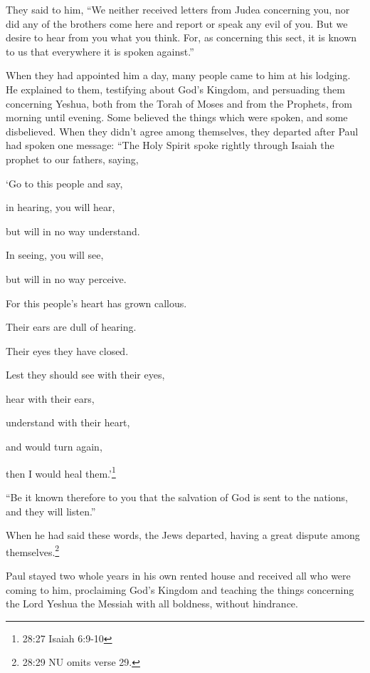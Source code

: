 \myverse{}They said to him, “We neither received letters from Judea concerning
you, nor did any of the brothers come here and report or speak any evil of you.
\myverse{}But we desire to hear from you what you think. For, as concerning this sect,
it is known to us that everywhere it is spoken against.”

\myverse{}When they had appointed him a day, many people came to him at
his lodging. He explained to them, testifying about God’s Kingdom, and persuading them concerning Yeshua,
both from the Torah of Moses and from the Prophets, from morning until evening.
\myverse{}Some believed the things which were spoken, and some disbelieved.
\myverse{}When they didn’t agree among themselves, they departed after Paul had spoken
one message: “The Holy Spirit spoke rightly through Isaiah the prophet to our fathers,
\myverse{}saying,

‘Go to this people and say,

in hearing, you will hear,

but will in no way understand.

In seeing, you will see,

but will in no way perceive.

\myverse{}For this people’s heart has grown callous.

Their ears are dull of hearing.

Their eyes they have closed.

Lest they should see with their eyes,

hear with their ears,

understand with their heart,

and would turn again,

then I would heal them.’\footnote{28:27 Isaiah 6:9-10}

\myverse{}“Be it known therefore to you that the salvation of God is sent
to the nations, and they will listen.”

\myverse{}When he had said these words, the Jews departed, having a great
dispute among themselves.\footnote{28:29 NU omits verse 29.}

\myverse{}Paul stayed two whole years in his own rented house and received
all who were coming to him,
\myverse{}proclaiming God’s Kingdom and teaching the things concerning the Lord Yeshua the Messiah
with all boldness, without hindrance.


